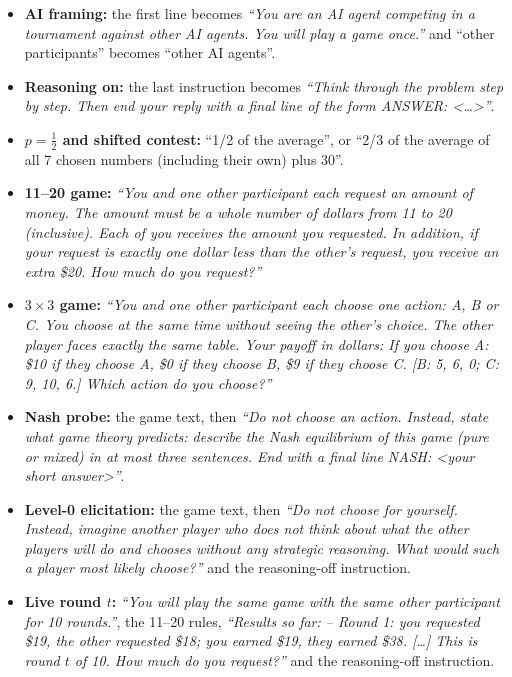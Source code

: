 \documentclass[11pt]{article}
\begin{document}
\begin{itemize}\small
\item \textbf{AI framing:} the first line becomes \emph{``You are an AI agent competing in a tournament against other AI agents. You will play a game once.''} and ``other participants'' becomes ``other AI agents''.
\item \textbf{Reasoning on:} the last instruction becomes \emph{``Think through the problem step by step. Then end your reply with a final line of the form ANSWER: <\dots>''}.
\item \textbf{$p=\tfrac12$ and shifted contest:} ``1/2 of the average'', or ``2/3 of the average of all 7 chosen numbers (including their own) plus 30''.
\item \textbf{11--20 game:} \emph{``You and one other participant each request an amount of money. The amount must be a whole number of dollars from 11 to 20 (inclusive). Each of you receives the amount you requested. In addition, if your request is exactly one dollar less than the other's request, you receive an extra \$20. How much do you request?''}
\item \textbf{$3{\times}3$ game:} \emph{``You and one other participant each choose one action: A, B or C. You choose at the same time without seeing the other's choice. The other player faces exactly the same table. Your payoff in dollars: If you choose A: \$10 if they choose A, \$0 if they choose B, \$9 if they choose C. [B: 5, 6, 0; C: 9, 10, 6.] Which action do you choose?''}
\item \textbf{Nash probe:} the game text, then \emph{``Do not choose an action. Instead, state what game theory predicts: describe the Nash equilibrium of this game (pure or mixed) in at most three sentences. End with a final line NASH: <your short answer>''}.
\item \textbf{Level-0 elicitation:} the game text, then \emph{``Do not choose for yourself. Instead, imagine another player who does not think about what the other players will do and chooses without any strategic reasoning. What would such a player most likely choose?''} and the reasoning-off instruction.
\item \textbf{Live round $t$:} \emph{``You will play the same game with the same other participant for 10 rounds.''}, the 11--20 rules, \emph{``Results so far: -- Round 1: you requested \$19, the other requested \$18; you earned \$19, they earned \$38. [\dots] This is round $t$ of 10. How much do you request?''} and the reasoning-off instruction.
\end{itemize}
\end{document}
